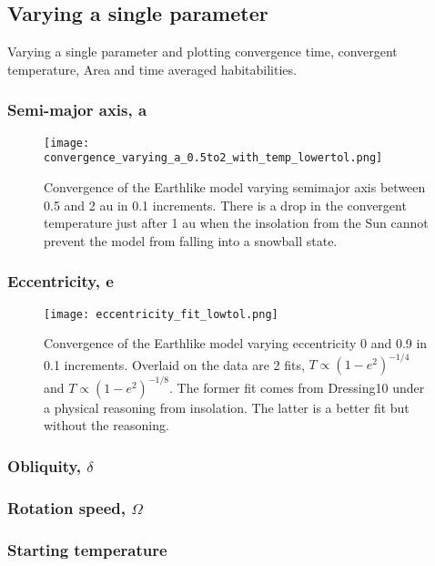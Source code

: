 \documentclass[12pt, onecolumn]{revtex4-2}    %
\begin{document}
\subsection{Varying a single parameter} \label{sec:single_param}

Varying a single parameter and plotting convergence time, convergent temperature, Area and time averaged habitabilities.

\subsubsection*{Semi-major axis, a}
\begin{figure}
    \texttt{[image: convergence\_varying\_a\_0.5to2\_with\_temp\_lowertol.png]}
    \caption{Convergence of the Earthlike model varying semimajor axis between 0.5 and 2 au in 0.1 increments.
        There is a drop in the convergent temperature just after 1 au when the insolation from the Sun cannot prevent the model from falling into a snowball state.}
\end{figure}


\subsubsection*{Eccentricity, e}
\begin{figure}
    \texttt{[image: eccentricity\_fit\_lowtol.png]}
    \caption{Convergence of the Earthlike model varying eccentricity 0 and 0.9 in 0.1 increments.
        Overlaid on the data are 2 fits, $T \propto (1-e^2)^{-1/4}$ and $T \propto (1-e^2)^{-1/8}$.
        The former fit comes from Dressing10 under a physical reasoning from insolation.
        The latter is a better fit but without the reasoning.}
\end{figure}

\subsubsection*{Obliquity, $\delta$}

\subsubsection*{Rotation speed, $\Omega$}

\subsubsection*{Starting temperature}
\end{document}
